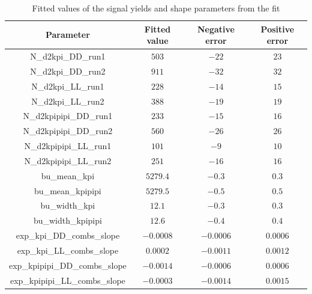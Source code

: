 \begin{table}[h]
\centering
{\footnotesize
\begin{tabular}{cccc}
Parameter & Fitted value & Negative error & Positive error \\
\hline
N\_d2kpi\_DD\_run1 & $503$ & $-22$ & $23$ \\
N\_d2kpi\_DD\_run2 & $911$ & $-32$ & $32$ \\
N\_d2kpi\_LL\_run1 & $228$ & $-14$ & $15$ \\
N\_d2kpi\_LL\_run2 & $388$ & $-19$ & $19$ \\
N\_d2kpipipi\_DD\_run1 & $233$ & $-15$ & $16$ \\
N\_d2kpipipi\_DD\_run2 & $560$ & $-26$ & $26$ \\
N\_d2kpipipi\_LL\_run1 & $101$ & $-9$ & $10$ \\
N\_d2kpipipi\_LL\_run2 & $251$ & $-16$ & $16$ \\
bu\_mean\_kpi & $5279.4$ & $-0.3$ & $0.3$ \\
bu\_mean\_kpipipi & $5279.5$ & $-0.5$ & $0.5$ \\
bu\_width\_kpi & $12.1$ & $-0.3$ & $0.3$ \\
bu\_width\_kpipipi & $12.6$ & $-0.4$ & $0.4$ \\
exp\_kpi\_DD\_combs\_slope & $-0.0008$ & $-0.0006$ & $0.0006$ \\
exp\_kpi\_LL\_combs\_slope & $0.0002$ & $-0.0011$ & $0.0012$ \\
exp\_kpipipi\_DD\_combs\_slope & $-0.0014$ & $-0.0006$ & $0.0006$ \\
exp\_kpipipi\_LL\_combs\_slope & $-0.0003$ & $-0.0014$ & $0.0015$ \\
\end{tabular}}
\caption{Fitted values of the signal yields and shape parameters from the \CP fit}
\label{cpfitresultsshapes}
\end{table}

